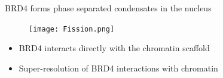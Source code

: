 \documentclass{beamer}					%
\begin{document}
\begin{frame}{BRD4 forms phase separated condensates in the nucleus}
\begin{figure}
\texttt{[image: Fission.png]}
\end{figure}
\begin{itemize}
\item BRD4 interacts directly with the chromatin scaffold
\item Super-resolution of BRD4 interactions with chromatin
\end{itemize}
\end{frame}

\end{document}
